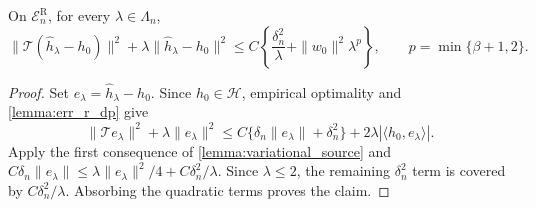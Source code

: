 \begin{lemma}\label{lemma:str_dp}
On $\mathcal E_n^{\mathrm R}$, for every $\lambda\in\Lambda_n$,
\[
\|\mathcal T(\hat h_\lambda-h_0)\|^2
+\lambda\|\hat h_\lambda-h_0\|^2
\leqslant C\left\{\frac{\delta_n^2}{\lambda}
+\|w_0\|^2\lambda^p\right\},
\qquad p=\min\{\beta+1,2\}.
\]
\end{lemma}
\begin{proof}
Set $e_\lambda=\hat h_\lambda-h_0$. Since $h_0\in\mathcal H$,
empirical optimality and \cref{lemma:err_r_dp} give
\[
\|\mathcal T e_\lambda\|^2+\lambda\|e_\lambda\|^2
\leqslant
C\{\delta_n\|e_\lambda\|+\delta_n^2\}
+2\lambda|\langle h_0,e_\lambda\rangle|.
\]
Apply the first consequence of \cref{lemma:variational_source} and
$C\delta_n\|e_\lambda\|\leqslant
\lambda\|e_\lambda\|^2/4+C\delta_n^2/\lambda$.
Since $\lambda\leqslant2$, the remaining $\delta_n^2$ term is covered by
$C\delta_n^2/\lambda$. Absorbing the quadratic terms proves the claim.
\end{proof}

